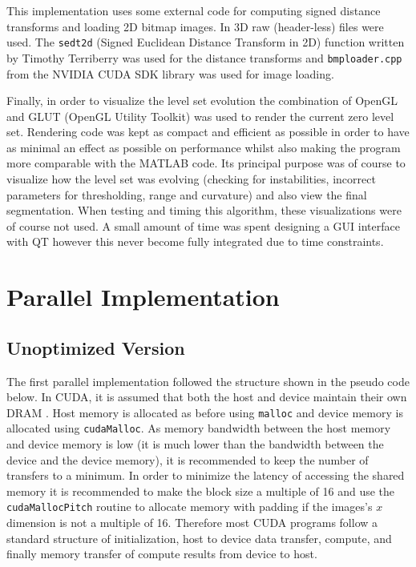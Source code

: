 This implementation uses some external code for computing signed distance transforms and loading 2D bitmap images. In 3D raw (header-less) files were used. The \texttt{sedt2d} (Signed Euclidean Distance Transform in 2D) function written by Timothy Terriberry was used for the distance transforms and \texttt{bmploader.cpp} from the NVIDIA CUDA SDK library was used for image loading.

Finally, in order to visualize the level set evolution the combination of OpenGL and GLUT (OpenGL Utility Toolkit) was used to render the current zero level set. Rendering code was kept as compact and efficient as possible in order to have as minimal an effect as possible on performance whilst also making the program more comparable with the MATLAB code. Its principal purpose was of course to visualize how the level set was evolving (checking for instabilities, incorrect parameters for thresholding, range and curvature) and also view the final segmentation. When testing and timing this algorithm, these visualizations were of course not used. A small amount of time was spent designing a GUI interface with QT however this never become fully integrated due to time constraints.

\section{Parallel Implementation}\label{parallel}
	\subsection{Unoptimized Version}
The first parallel implementation followed the structure shown in the pseudo code below. In CUDA, it is assumed that both the host and device maintain their own DRAM \cite{cuda}. Host memory is allocated as before using \texttt{malloc} and device memory is allocated using \texttt{cudaMalloc}. As memory bandwidth between the host memory and device memory is low (it is much lower than the bandwidth between the device and the device memory), it is recommended to keep the number of transfers to a minimum. In order to minimize the latency of accessing the shared memory it is recommended to make the block size a multiple of 16 and use the \texttt{cudaMallocPitch} routine to allocate memory with padding if the images's $x$ dimension is not a multiple of 16. Therefore most CUDA programs follow a standard structure of initialization, host to device data transfer, compute, and finally memory transfer of compute results from device to host. 

